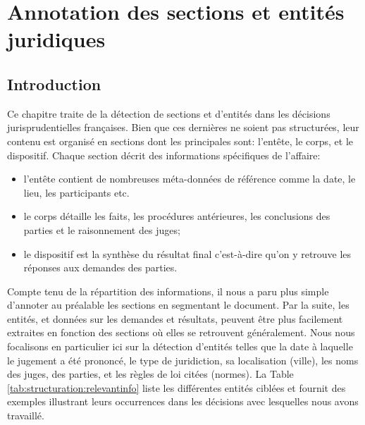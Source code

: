 \chapter{Annotation des sections et entités juridiques}
\label{chap:structuration}


\section{Introduction}
\label{sec:structuration:motivation}
Ce chapitre traite de la détection de sections et d'entités dans les décisions jurisprudentielles françaises. Bien que ces dernières ne soient pas structurées, leur contenu est organisé en sections dont les principales sont: l'entête, le corps, et le dispositif. Chaque section décrit des informations spécifiques de l'affaire: 
\begin{itemize}
	\item l'entête contient de nombreuses méta-données de référence comme la date, le lieu, les participants etc.
	\item le corps détaille les faits, les procédures antérieures, les conclusions des parties et le raisonnement des juges;
	\item le dispositif est la synthèse du résultat final c'est-à-dire qu'on y retrouve les réponses aux demandes des parties.
\end{itemize}

Compte tenu de la répartition des informations, il nous a paru plus simple d'annoter au préalable les sections en segmentant le document. Par la suite, les entités, et données sur les demandes et résultats, peuvent être plus facilement extraites en fonction des sections où elles se retrouvent généralement. Nous nous focalisons en particulier ici sur la détection d'entités telles que la date à laquelle le jugement a été prononcé, le type de juridiction, sa localisation (ville), les noms des juges, des parties, et les règles de loi citées (normes). La Table \ref{tab:structuration:relevantinfo} liste les différentes entités ciblées et fournit des exemples illustrant leurs occurrences dans les décisions avec lesquelles nous avons travaillé.

